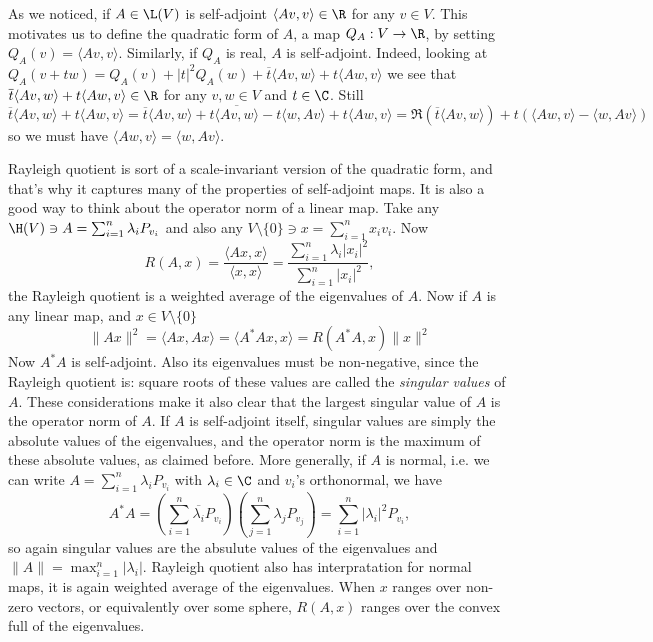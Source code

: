 As we noticed, if $A \in \L(V)$ is self-adjoint $\langle A v, v \rangle \in \R$ for any $v \in V$. This motivates us to define the quadratic form of $A$, a map $Q_{A} : V \to \R$, by setting $Q_{A}(v) = \langle A v, v \rangle$. Similarly, if $Q_{A}$ is real, $A$ is self-adjoint. Indeed, looking at $Q_{A}(v + t w) = Q_{A}(v) + |t|^2 Q_{A}(w) + \overline{t} \langle A v, w \rangle + t \langle A w, v \rangle$ we see that $\overline{t} \langle A v, w \rangle + t \langle A w, v \rangle \in \R$ for any $v, w \in V$ and $t \in \C$. Still $\overline{t} \langle A v, w \rangle + t \langle A w, v \rangle = \overline{t} \langle A v, w \rangle + t \overline{\langle A v, w \rangle} - t \langle w, A v \rangle   + t \langle A w, v \rangle = \Re(\overline{t} \langle A v, w \rangle) + t (\langle A w, v \rangle  - \langle w, A v \rangle) $ so we must have $\langle A w, v \rangle  = \langle w, A v \rangle$.

Rayleigh quotient is sort of a scale-invariant version of the quadratic form, and that's why it captures many of the properties of self-adjoint maps. It is also a good way to think about the operator norm of a linear map. Take any $\H(V) \ni A = \sum_{i = 1}^{n} \lambda_{i} P_{v_{i}}$ and also any $V \setminus \{0\} \ni x = \sum_{i = 1}^{n} x_{i} v_{i}$. Now
\[
	R(A, x) = \frac{\langle A x, x \rangle}{\langle x, x \rangle} = \frac{\sum_{i = 1}^{n} \lambda_{i} |x_{i}|^2}{\sum_{i = 1}^{n} |x_{i}|^2},
\]
the Rayleigh quotient is a weighted average of the eigenvalues of $A$. Now if $A$ is any linear map, and $x \in V \setminus \{0\}$
\[
	\|A x\|^{2} = \langle A x, A x \rangle = \langle A^{*} A x, x \rangle = R(A^{*} A, x) \|x\|^{2}
\]
Now $A^{*} A$ is self-adjoint. Also its eigenvalues must be non-negative, since the Rayleigh quotient is: square roots of these values are called the \textit{singular values} of $A$. These considerations make it also clear that the largest singular value of $A$ is the operator norm of $A$. If $A$ is self-adjoint itself, singular values are simply the absolute values of the eigenvalues, and the operator norm is the maximum of these absolute values, as claimed before. More generally, if $A$ is normal, i.e. we can write $A = \sum_{i = 1}^{n}\lambda_{i} P_{v_{i}}$ with $\lambda_{i} \in \C$ and $v_{i}$'s orthonormal, we have
\[
	A^{*} A = \left(\sum_{i = 1}^{n} \overline{\lambda_{i}} P_{v_{i}}\right) \left( \sum_{j = 1}^{n} \lambda_{j} P_{v_{j}} \right) = \sum_{i = 1}^{n} |\lambda_{i}|^2 P_{v_{i}},
\]
so again singular values are the absulute values of the eigenvalues and $\|A\| = \max_{i = 1}^{n} |\lambda_{i}|$. Rayleigh quotient also has interpratation for normal maps, it is again weighted average of the eigenvalues. When $x$ ranges over non-zero vectors, or equivalently over some sphere, $R(A, x)$ ranges over the convex full of the eigenvalues.

